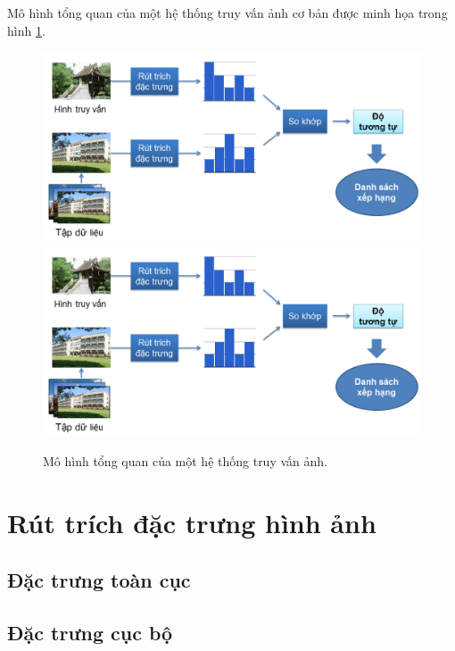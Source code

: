 Mô hình tổng quan của một hệ thống truy vấn ảnh cơ bản được minh họa trong hình \ref{FigOverall}.

\begin{figure}[!htbp]
  \begin{center}
    \leavevmode
    \ifpdf
      \includegraphics[scale=0.45]{overall}
    \else
      \includegraphics[scale=0.45]{overall}
    \fi
    \caption[Mô hình tổng quan của một hệ thống truy vấn ảnh]{Mô hình tổng quan của một hệ thống truy vấn ảnh.}
    \label{FigOverall}
  \end{center}
\end{figure}

\section{Rút trích đặc trưng hình ảnh}

\subsection{Đặc trưng toàn cục}

\subsection{Đặc trưng cục bộ}
\label{local-features}


